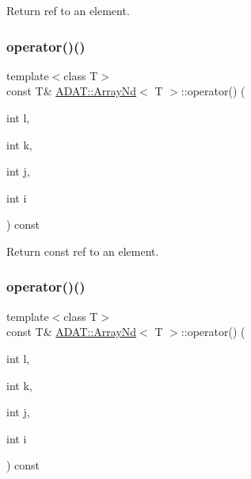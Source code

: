 Return ref to an element. 

\mbox{\label{classADAT_1_1ArrayNd_aa2f8e4f6fa9a05745538791ba4f70aff}} 
\subsubsection{\texorpdfstring{operator()()}{operator()()}\hspace{0.1cm}{\footnotesize\ttfamily [15/16]}}
{\footnotesize\ttfamily template$<$class T$>$ \\
const T\& \mbox{\hyperlink{classADAT_1_1ArrayNd}{A\+D\+A\+T\+::\+Array\+Nd}}$<$ T $>$\+::operator() (\begin{DoxyParamCaption}\item[{int}]{l,  }\item[{int}]{k,  }\item[{int}]{j,  }\item[{int}]{i }\end{DoxyParamCaption}) const\hspace{0.3cm}{\ttfamily [inline]}}



Return const ref to an element. 

\mbox{\label{classADAT_1_1ArrayNd_aa2f8e4f6fa9a05745538791ba4f70aff}} 
\subsubsection{\texorpdfstring{operator()()}{operator()()}\hspace{0.1cm}{\footnotesize\ttfamily [16/16]}}
{\footnotesize\ttfamily template$<$class T$>$ \\
const T\& \mbox{\hyperlink{classADAT_1_1ArrayNd}{A\+D\+A\+T\+::\+Array\+Nd}}$<$ T $>$\+::operator() (\begin{DoxyParamCaption}\item[{int}]{l,  }\item[{int}]{k,  }\item[{int}]{j,  }\item[{int}]{i }\end{DoxyParamCaption}) const\hspace{0.3cm}{\ttfamily [inline]}}



